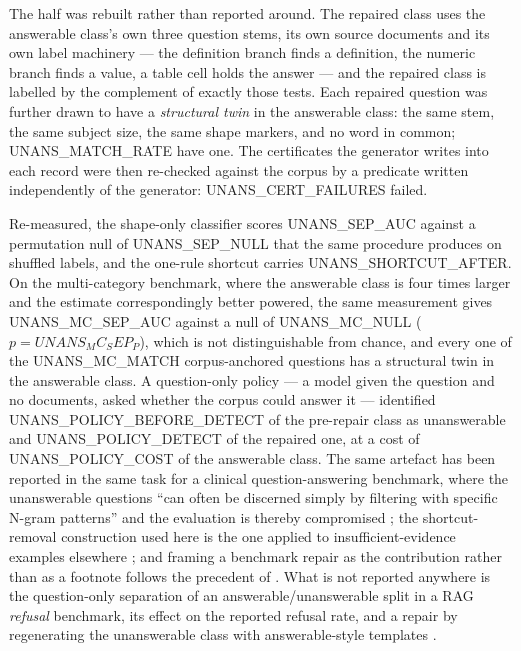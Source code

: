 \documentclass[preprint,3p,times]{elsarticle}
\begin{document}
The half was rebuilt rather than reported around. The repaired class uses the
answerable class's own three question stems, its own source documents and its
own label machinery --- the definition branch finds a definition, the numeric
branch finds a value, a table cell holds the answer --- and the repaired class
is labelled by the complement of exactly those tests. Each repaired question
was further drawn to have a \emph{structural twin} in the answerable class:
the same stem, the same subject size, the same shape markers, and no word in
common; {{UNANS_MATCH_RATE}} have one. The certificates the generator
writes into each record were then re-checked against the corpus by a predicate
written independently of the generator: {{UNANS_CERT_FAILURES}} failed.

Re-measured, the shape-only classifier scores {{UNANS_SEP_AUC}} against a
permutation null of {{UNANS_SEP_NULL}}
 that the same procedure produces on
shuffled labels, and the one-rule shortcut carries {{UNANS_SHORTCUT_AFTER}}. On
the multi-category benchmark, where the answerable class is four times larger
and the estimate correspondingly better powered, the same measurement gives
{{UNANS_MC_SEP_AUC}} against a null of {{UNANS_MC_NULL}}
($p = {{UNANS_MC_SEP_P}}$), which is not distinguishable from chance, and every
one of the {{UNANS_MC_MATCH}} corpus-anchored questions has a structural twin
in the answerable class. A
question-only policy --- a model given the question and no documents, asked
whether the corpus could answer it --- identified
{{UNANS_POLICY_BEFORE_DETECT}} of the pre-repair class as unanswerable and
{{UNANS_POLICY_DETECT}} of the repaired one, at a cost of
{{UNANS_POLICY_COST}} of the answerable class.
The same artefact has been reported in the same task for a clinical question-answering benchmark, where the unanswerable questions ``can often be discerned simply by filtering with specific N-gram patterns'' and the evaluation is thereby compromised \cite{yang2024ehrsql}; the shortcut-removal construction used here is the one applied to insufficient-evidence examples elsewhere \cite{mondal2026beforeanswering}; and framing a benchmark repair as the contribution rather than as a footnote follows the precedent of \cite{brunello2026folio}. What is not reported anywhere is the question-only separation of an answerable/unanswerable split in a RAG \emph{refusal} benchmark, its effect on the reported refusal rate, and a repair by regenerating the unanswerable class with answerable-style templates \cite{gautam2023unanswerable}.
\end{document}
